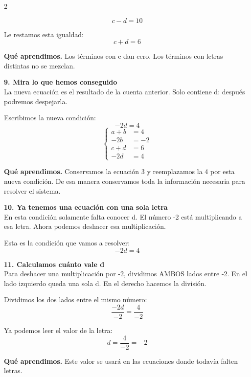 \documentclass[11pt,a4paper,landscape]{article}
\begin{document}
\begin{multicols*}{2}
\begin{minipage}{\linewidth}
\[c - d = 10\]
\par\smallskip Le restamos esta igualdad:
\[c + d = 6\]
\par\smallskip\textbf{Qué aprendimos.} Los términos con c dan cero. Los términos con letras distintas no se mezclan.
\end{minipage}\par\medskip
\noindent\begin{minipage}{\linewidth}\textbf{9. Mira lo que hemos conseguido}\\[2pt]La nueva ecuación es el resultado de la cuenta anterior. Solo contiene d: después podremos despejarla.
\par\smallskip Escribimos la nueva condición:
\[-2d = 4\]
\[\left\{\begin{aligned}a + b &= 4\\-2b &= -2\\c + d &= 6\\-2d &= 4\end{aligned}\right.\]
\par\smallskip\textbf{Qué aprendimos.} Conservamos la ecuación 3 y reemplazamos la 4 por esta nueva condición. De esa manera conservamos toda la información necesaria para resolver el sistema.
\end{minipage}\par\medskip
\noindent\begin{minipage}{\linewidth}\textbf{10. Ya tenemos una ecuación con una sola letra}\\[2pt]En esta condición solamente falta conocer d. El número -2 está multiplicando a esa letra. Ahora podemos deshacer esa multiplicación.
\par\smallskip Esta es la condición que vamos a resolver:
\[-2d = 4\]
\end{minipage}\par\medskip
\noindent\begin{minipage}{\linewidth}\textbf{11. Calculamos cuánto vale d}\\[2pt]Para deshacer una multiplicación por -2, dividimos AMBOS lados entre -2. En el lado izquierdo queda una sola d. En el derecho hacemos la división.
\par\smallskip Dividimos los dos lados entre el mismo número:
\[\frac{-2d}{-2}=\frac{4}{-2}\]
\par\smallskip Ya podemos leer el valor de la letra:
\[d=\frac{4}{-2}=-2\]
\par\smallskip\textbf{Qué aprendimos.} Este valor se usará en las ecuaciones donde todavía falten letras.

\end{minipage}
\end{multicols*}
\end{document}
